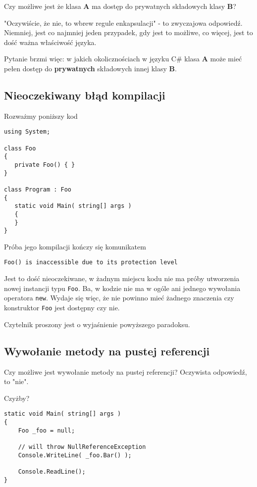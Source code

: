 Czy możliwe jest że klasa {\bf A} ma dostęp do prywatnych składowych klasy {\bf B}? 

"Oczywiście, że nie, to wbrew regule enkapsulacji" - to zwyczajowa odpowiedź. Niemniej, jest co najmniej jeden przypadek, gdy jest to możliwe, co więcej, jest to dość ważna właściwość języka.

Pytanie brzmi więc: w jakich okolicznościach w języku C\# klasa {\bf A} może mieć pełen dostęp do {\bf prywatnych} składowych innej klasy {\bf B}.

\subsection{Nieoczekiwany błąd kompilacji}

Rozważmy poniższy kod

\begin{scriptsize}
\begin{verbatim}
using System;

class Foo
{
   private Foo() { }
}
  
class Program : Foo
{
   static void Main( string[] args )
   {
   }
}
\end{verbatim}
\end{scriptsize}

Próba jego kompilacji kończy się komunikatem

\begin{scriptsize}
\begin{verbatim}
Foo() is inaccessible due to its protection level
\end{verbatim}
\end{scriptsize}

Jest to dość nieoczekiwane, w żadnym miejscu kodu nie ma próby utworzenia nowej instancji typu {\tt Foo}. Ba, w kodzie nie ma w ogóle ani jednego wywołania operatora {\tt new}.
Wydaje się więc, że nie powinno mieć żadnego znaczenia czy konstruktor {\tt Foo} jest dostępny czy nie.

Czytelnik proszony jest o wyjaśnienie powyższego paradoksu.

\subsection{Wywołanie metody na pustej referencji}

Czy możliwe jest wywołanie metody na pustej referencji? Oczywista odpowiedź, to "nie".

Czyżby?

\begin{scriptsize}
\begin{verbatim}
static void Main( string[] args )
{
    Foo _foo = null;
 
    // will throw NullReferenceException
    Console.WriteLine( _foo.Bar() );
 
    Console.ReadLine();
}
\end{verbatim}
\end{scriptsize}

